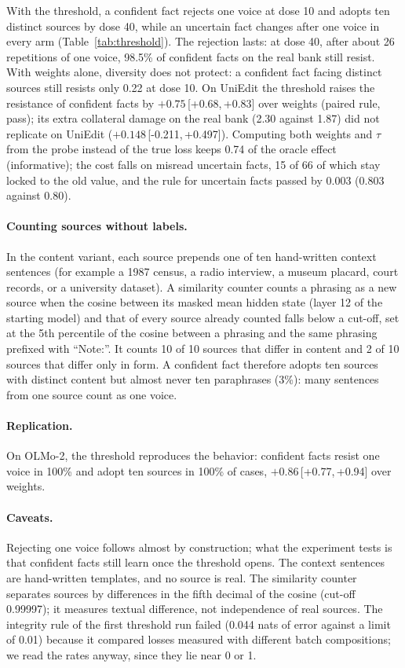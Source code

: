 \documentclass[11pt]{article}
\newcommand{\ci}[2]{\,[#1,\,#2]}
\begin{document}
With the threshold, a confident fact rejects one voice at dose 10 and adopts ten distinct sources by dose 40, while an uncertain fact changes after one voice in every arm (Table~\ref{tab:threshold}).
The rejection lasts: at dose 40, after about 26 repetitions of one voice, 98.5\% of confident facts on the real bank still resist.
With weights alone, diversity does not protect: a confident fact facing distinct sources still resists only 0.22 at dose 10.
On UniEdit the threshold raises the resistance of confident facts by $+0.75$\ci{+0.68}{+0.83} over weights (paired rule, pass); its extra collateral damage on the real bank (2.30 against 1.87) did not replicate on UniEdit ($+0.148$\ci{-0.211}{+0.497}).
Computing both weights and $\tau$ from the probe instead of the true loss keeps 0.74 of the oracle effect (informative); the cost falls on misread uncertain facts, 15 of 66 of which stay locked to the old value, and the rule for uncertain facts passed by 0.003 (0.803 against 0.80).

\paragraph{Counting sources without labels.}
In the content variant, each source prepends one of ten hand-written context sentences (for example a 1987 census, a radio interview, a museum placard, court records, or a university dataset).
A similarity counter counts a phrasing as a new source when the cosine between its masked mean hidden state (layer 12 of the starting model) and that of every source already counted falls below a cut-off, set at the 5th percentile of the cosine between a phrasing and the same phrasing prefixed with ``Note:''.
It counts 10 of 10 sources that differ in content and 2 of 10 sources that differ only in form.
A confident fact therefore adopts ten sources with distinct content but almost never ten paraphrases (3\%): many sentences from one source count as one voice.

\paragraph{Replication.}
On OLMo-2, the threshold reproduces the behavior: confident facts resist one voice in 100\% and adopt ten sources in 100\% of cases, $+0.86$\ci{+0.77}{+0.94} over weights.

\paragraph{Caveats.}
Rejecting one voice follows almost by construction; what the experiment tests is that confident facts still learn once the threshold opens.
The context sentences are hand-written templates, and no source is real.
The similarity counter separates sources by differences in the fifth decimal of the cosine (cut-off 0.99997); it measures textual difference, not independence of real sources.
The integrity rule of the first threshold run failed (0.044 nats of error against a limit of 0.01) because it compared losses measured with different batch compositions; we read the rates anyway, since they lie near 0 or 1.
\end{document}
